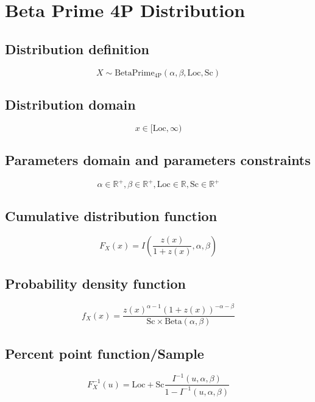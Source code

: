 \documentclass{article}
\begin{document}
\newpage
\section{Beta Prime 4P Distribution}
\subsection{Distribution definition}
\begin{equation*} X\sim\mathrm{BetaPrime}_{\mathrm{4P}}\left(\alpha,\beta,\text{Loc},\text{Sc}\right) \end{equation*}
\subsection{Distribution domain}
\begin{equation*} x\in [\text{Loc},\infty) \end{equation*}
\subsection{Parameters domain and parameters constraints}
\begin{equation*} \alpha\in\mathbb{R}^{+}, \beta\in\mathbb{R}^{+}, \text{Loc}\in\mathbb{R}, \text{Sc}\in\mathbb{R}^{+} \end{equation*}
\subsection{Cumulative distribution function}
\begin{equation*} F_{X}\left(x\right)=I\left(\frac{z(x)}{1+z(x)},\alpha,\beta\right) \end{equation*}
\subsection{Probability density function}
\begin{equation*} f_{X}\left(x\right)=\frac{z(x)^{\alpha-1} (1+z(x))^{-\alpha -\beta}}{\text{Sc}\times \text{Beta}(\alpha,\beta)} \end{equation*}
\subsection{Percent point function/Sample}
\begin{equation*} F^{-1}_{X}\left(u\right)=\text{Loc}+\text{Sc}\frac{I^{-1}\left(u,\alpha,\beta\right)}{1-I^{-1}\left(u,\alpha,\beta\right)} \end{equation*}
\end{document}
